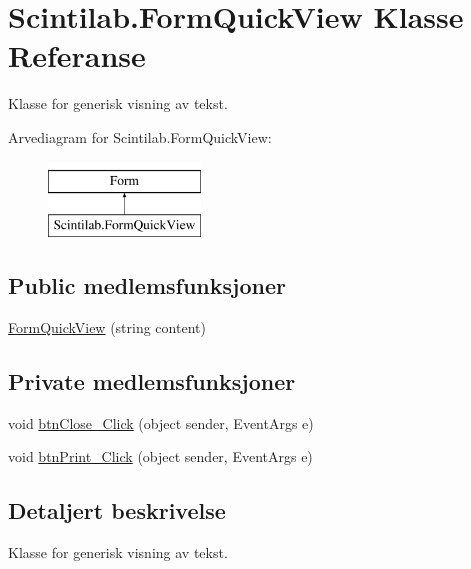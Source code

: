 \hypertarget{class_scintilab_1_1_form_quick_view}{\section{Scintilab.\+Form\+Quick\+View Klasse Referanse}
\label{class_scintilab_1_1_form_quick_view}
}


Klasse for generisk visning av tekst.  


Arvediagram for Scintilab.\+Form\+Quick\+View\+:\begin{figure}[H]
\begin{center}
\leavevmode
\includegraphics[height=2.000000cm]{class_scintilab_1_1_form_quick_view}
\end{center}
\end{figure}
\subsection*{Public medlemsfunksjoner}
\begin{DoxyCompactItemize}
\item 
\hyperlink{class_scintilab_1_1_form_quick_view_abf21b337b509beb8c019afd6060debb6}{Form\+Quick\+View} (string content)
\end{DoxyCompactItemize}
\subsection*{Private medlemsfunksjoner}
\begin{DoxyCompactItemize}
\item 
void \hyperlink{class_scintilab_1_1_form_quick_view_a6a301d86376c47fd9de9d9c372353121}{btn\+Close\+\_\+\+Click} (object sender, Event\+Args e)
\item 
void \hyperlink{class_scintilab_1_1_form_quick_view_a710dbbd43f0f6af94cfe2fd9f5ff8b8b}{btn\+Print\+\_\+\+Click} (object sender, Event\+Args e)
\end{DoxyCompactItemize}


\subsection{Detaljert beskrivelse}
Klasse for generisk visning av tekst. 

